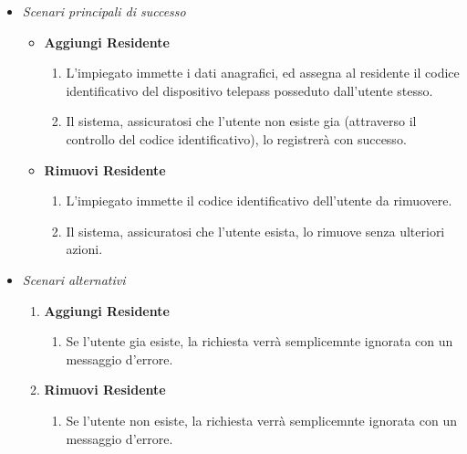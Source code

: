 \documentclass[12pt, letterpaper]{article}
\begin{document}
\begin{itemize}
    \item \emph{Scenari principali di successo}
    \begin{itemize}
        \item \textbf{Aggiungi Residente}
        \begin{enumerate}
            \item L'impiegato immette i dati 
            anagrafici, ed assegna al residente 
            il codice identificativo del 
            dispositivo telepass posseduto 
            dall'utente stesso.
            \item Il sistema, assicuratosi che 
            l'utente non esiste gia (attraverso 
            il controllo del codice identificativo), 
            lo registrerà con successo.
        \end{enumerate}

        \item \textbf{Rimuovi Residente}
        \begin{enumerate}
            \item L'impiegato immette il codice 
            identificativo dell'utente da rimuovere.
            \item Il sistema, assicuratosi che 
            l'utente esista, lo rimuove senza 
            ulteriori azioni.
        \end{enumerate}
    \end{itemize}

    \item \emph{Scenari alternativi}
    \begin{enumerate}
        \item \textbf{Aggiungi Residente}
        \begin{enumerate}
            \item Se l'utente gia esiste, 
            la richiesta verrà semplicemnte 
            ignorata con un messaggio d'errore.
        \end{enumerate}

        \item \textbf{Rimuovi Residente}
        \begin{enumerate}
            \item Se l'utente non esiste, 
            la richiesta verrà semplicemnte 
            ignorata con un messaggio d'errore.
        \end{enumerate}
    \end{enumerate}
\end{itemize}
\end{document}
